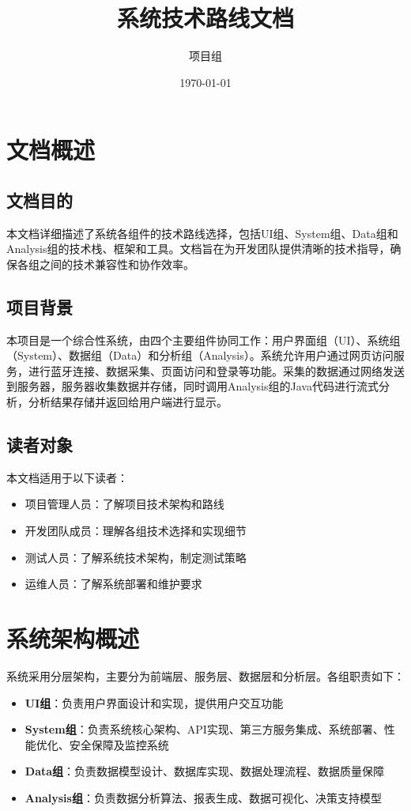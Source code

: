 \documentclass[a4paper,12pt]{article}
\title{系统技术路线文档}
\author{项目组}
\date{\today}
\begin{document}
\maketitle
\tableofcontents
\newpage

\section{文档概述}

\subsection{文档目的}

本文档详细描述了系统各组件的技术路线选择，包括UI组、System组、Data组和Analysis组的技术栈、框架和工具。文档旨在为开发团队提供清晰的技术指导，确保各组之间的技术兼容性和协作效率。

\subsection{项目背景}

本项目是一个综合性系统，由四个主要组件协同工作：用户界面组（UI）、系统组（System）、数据组（Data）和分析组（Analysis）。系统允许用户通过网页访问服务，进行蓝牙连接、数据采集、页面访问和登录等功能。采集的数据通过网络发送到服务器，服务器收集数据并存储，同时调用Analysis组的Java代码进行流式分析，分析结果存储并返回给用户端进行显示。

\subsection{读者对象}

本文档适用于以下读者：
\begin{itemize}
  \item 项目管理人员：了解项目技术架构和路线
  \item 开发团队成员：理解各组技术选择和实现细节
  \item 测试人员：了解系统技术架构，制定测试策略
  \item 运维人员：了解系统部署和维护要求
\end{itemize}

\section{系统架构概述}

系统采用分层架构，主要分为前端层、服务层、数据层和分析层。各组职责如下：

\begin{itemize}
  \item \textbf{UI组}：负责用户界面设计和实现，提供用户交互功能
  \item \textbf{System组}：负责系统核心架构、API实现、第三方服务集成、系统部署、性能优化、安全保障及监控系统
  \item \textbf{Data组}：负责数据模型设计、数据库实现、数据处理流程、数据质量保障
  \item \textbf{Analysis组}：负责数据分析算法、报表生成、数据可视化、决策支持模型
\end{itemize}
\end{document}
